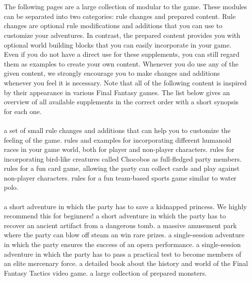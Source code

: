 \\\\
%
The following pages are a large collection of modular  to the game.
These modules can be separated into two categories: rule changes and prepared content.
Rule changes are optional rule modifications and additions that you can use to customize your adventures.
In contrast, the prepared content provides you with optional world building blocks that you can easily incorporate in your game.
Even if you do not have a direct use for these supplements, you can still regard them as examples to create your own content.
Whenever you do use any of the given content, we strongly encourage you to make changes and additions whenever you feel it is necessary. 
Note that all of the following content is inspired by their appearance in various Final Fantasy games.
The list below gives an overview of all available supplements in the correct order with a short synopsis for each one.
%
\vfill
%
\\\\
 a set of small rule changes and additions that can help you to customize the feeling of the game. \ofrow
{} rules and examples for incorporating different humanoid races in your game world, both for player and non-player characters.\ofrow
{} rules for incorporating bird-like creatures called Chocobos as full-fledged party members.\ofrow
{} rules for a fun card game, allowing the party can collect cards and play against non-player characters.\ofrow
{}  rules for a fun team-based sports game similar to water polo. 
%
\vfill
%
\\\\
 a short adventure in which the party has to save a kidnapped princess. We highly recommend this for beginners! \ofrow
{} a short adventure in which the party has to recover an ancient artifact from a dangerous tomb. \ofrow
{} a massive amusement park where the party can blow off steam an win rare prizes. \ofrow
{} a single-session adventure in which the party ensures the success of an opera performance. \ofrow
{} a single-session adventure in which the party has to pass a practical test to become members of an elite mercenary force. \ofrow
{} a detailed book about the history and world of the Final Fantasy Tactics video game. \ofrow
{} a large collection of prepared monsters.
%
\clearpage



